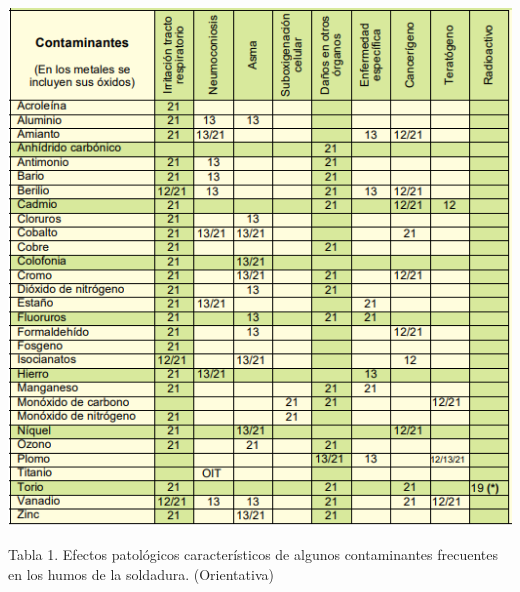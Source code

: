 \documentclass[12pt,letterpaper]{article}
\begin{document}
\includegraphics[scale=1.3]{imag4.png}  

\begin{center}
Tabla 1. Efectos patológicos característicos de algunos contaminantes frecuentes en los humos de la soldadura. (Orientativa)
\end{center}

\newpage
\end{document}
